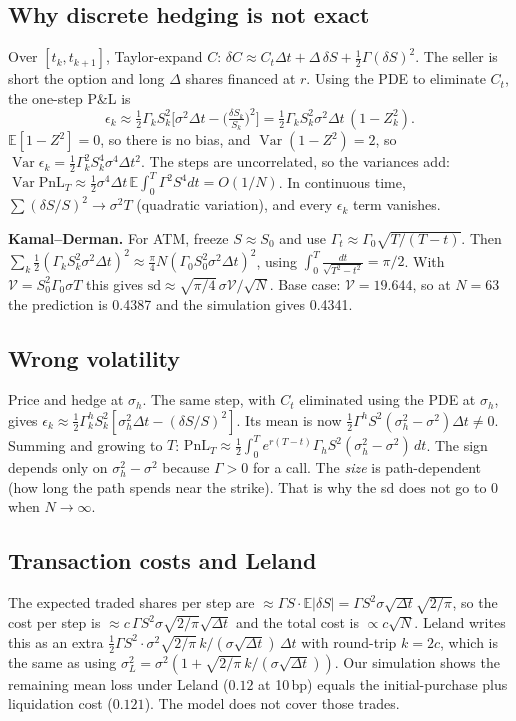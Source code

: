 \documentclass[10.5pt,a4paper]{article}
\newcommand{\PnL}{\mathrm{PnL}_T}
\begin{document}
\subsection{Why discrete hedging is not exact}
Over $[t_k,t_{k+1}]$, Taylor-expand $C$: $\delta C\approx C_t\Delta t+\Delta\,\delta S+\tfrac12\Gamma(\delta S)^2$. The seller is short the option and long $\Delta$ shares financed at $r$.
Using the PDE to eliminate $C_t$, the one-step P\&L is
\[\epsilon_k\approx\tfrac12\Gamma_kS_k^2\Big[\sigma^2\Delta t-\big(\tfrac{\delta S_k}{S_k}\big)^2\Big]=\tfrac12\Gamma_kS_k^2\sigma^2\Delta t\,(1-Z_k^2).\]
$\mathbb E[1-Z^2]=0$, so there is no bias, and $\operatorname{Var}(1-Z^2)=2$, so $\operatorname{Var}\epsilon_k=\tfrac12\Gamma_k^2S_k^4\sigma^4\Delta t^2$. The steps are uncorrelated, so the variances add:
$\operatorname{Var}\PnL\approx\tfrac12\sigma^4\Delta t\,\mathbb E\!\int_0^T\Gamma^2S^4dt=O(1/N)$. In continuous time, $\sum(\delta S/S)^2\to\sigma^2T$ (quadratic variation), and every $\epsilon_k$ term vanishes.

\textbf{Kamal--Derman.} For ATM, freeze $S\approx S_0$ and use $\Gamma_t\approx\Gamma_0\sqrt{T/(T-t)}$. Then $\sum_k\tfrac12(\Gamma_kS_k^2\sigma^2\Delta t)^2\approx\tfrac{\pi}{4}N(\Gamma_0S_0^2\sigma^2\Delta t)^2$, using $\int_0^T\frac{dt}{\sqrt{T^2-t^2}}=\pi/2$.
With $\mathcal V=S_0^2\Gamma_0\sigma T$ this gives $\mathrm{sd}\approx\sqrt{\pi/4}\,\sigma\mathcal V/\sqrt N$. Base case: $\mathcal V=19.644$, so at $N=63$ the prediction is 0.4387 and the simulation gives 0.4341.

\subsection{Wrong volatility}
Price and hedge at $\sigma_h$. The same step, with $C_t$ eliminated using the PDE at $\sigma_h$, gives $\epsilon_k\approx\tfrac12\Gamma^h_kS_k^2[\sigma_h^2\Delta t-(\delta S/S)^2]$. Its mean is now
$\tfrac12\Gamma^hS^2(\sigma_h^2-\sigma^2)\Delta t\neq0$. Summing and growing to $T$:
$\PnL\approx\tfrac12\int_0^Te^{r(T-t)}\Gamma_h S^2(\sigma_h^2-\sigma^2)\,dt$. The sign depends only on $\sigma_h^2-\sigma^2$ because $\Gamma>0$ for a call. The \emph{size} is path-dependent
(how long the path spends near the strike). That is why the sd does not go to 0 when $N\to\infty$.

\subsection{Transaction costs and Leland}
The expected traded shares per step are $\approx\Gamma S\cdot\mathbb E|\delta S|=\Gamma S^2\sigma\sqrt{\Delta t}\sqrt{2/\pi}$, so the cost per step is $\approx c\,\Gamma S^2\sigma\sqrt{2/\pi}\sqrt{\Delta t}$ and the total cost is $\propto c\sqrt N$.
Leland writes this as an extra $\tfrac12\Gamma S^2\cdot\sigma^2\sqrt{2/\pi}\,k/(\sigma\sqrt{\Delta t})\,\Delta t$ with round-trip $k=2c$, which is the same as using
$\sigma_L^2=\sigma^2(1+\sqrt{2/\pi}\,k/(\sigma\sqrt{\Delta t}))$. Our simulation shows the remaining mean loss under Leland ($0.12$ at 10\,bp) equals the initial-purchase plus liquidation cost ($0.121$). The model does not cover those trades.
\end{document}
